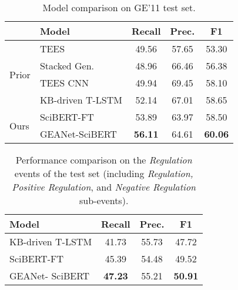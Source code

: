 \documentclass[11pt,a4paper]{article}
\newcommand{\GAENet}{\textrm{GEANet}}
\newcommand{\GE}{\textrm{{\fontfamily{qcr}\selectfont GE'11} }}
\begin{document}
\begin{table}[t]
\small
\centering
\begin{tabular}{llccc}
\hline & \textbf{Model}  & \textbf{Recall}  & \textbf{Prec.}  & \textbf{F1} \\ \hline
\multirow{4}{*}{Prior} & TEES & 49.56 & 57.65 & 53.30 \\
& Stacked Gen. & 48.96 &  66.46 & 56.38 \\
& TEES CNN & 49.94 & 69.45 & 58.10        \\
& KB-driven T-LSTM & 52.14 & 67.01 & 58.65 \\
\hline
\hline
\multirow{2}{*}{Ours} & SciBERT-FT & 53.89 & 63.97 & 58.50 \\
& \GAENet-SciBERT & \textbf{56.11}  &  64.61 &  \textbf{60.06} \\
\hline
\end{tabular}
\caption{\label{font-table} Model comparison on \GE test set.}
\label{overall_comparison}
\end{table}


\begin{table}[t]
\small
\centering
\begin{tabular}{@{\ \ }l|c@{\ \ }c@{\ \ }c@{\ \ }}
\hline \textbf{Model} & \textbf{Recall}  & \textbf{Prec.}  & \textbf{F1} \\
\hline

 KB-driven T-LSTM  & 41.73 & 55.73  & 47.72 \\
\hline
\hline

 SciBERT-FT  & 45.39 & 54.48 & 49.52 \\
 \GAENet- SciBERT  & \textbf{47.23} &  55.21 & \textbf{50.91} \\


\hline
\end{tabular}
\caption{\label{font-table} Performance comparison on the \textit{Regulation} events of the test set (including \textit{Regulation, Positive Regulation}, and \textit{Negative Regulation} sub-events). }
\label{regulation_comparison}
\vspace{-1em}
\end{table}
\end{document}
